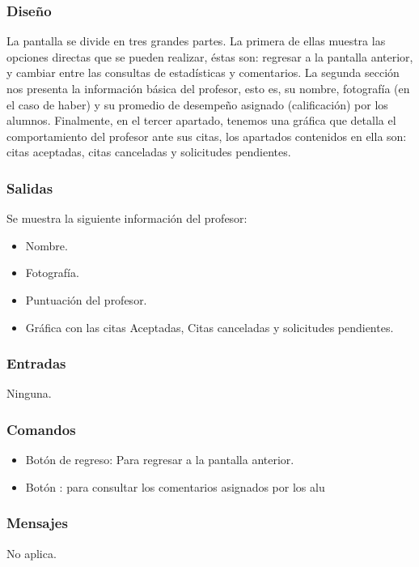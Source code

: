 \subsubsection{Diseño}
	\noindent
	La pantalla se divide en tres grandes partes. La primera de ellas muestra las opciones directas que se pueden realizar, éstas son: regresar a la pantalla anterior, y cambiar entre las consultas de estadísticas y comentarios. La segunda sección nos presenta la información básica del profesor, esto es, su nombre, fotografía (en el caso de haber) y su promedio de desempeño asignado (calificación) por los alumnos. Finalmente, en el tercer apartado, tenemos una gráfica que detalla el comportamiento del profesor ante sus citas, los apartados contenidos en ella son: citas aceptadas, citas canceladas y solicitudes pendientes. 

\pagebreak
{}

\subsubsection{Salidas}
	Se muestra la siguiente información del profesor:
	\begin{itemize} 
		\item Nombre.
		\item Fotografía.
		\item Puntuación del profesor.
		\item Gráfica con las citas Aceptadas, Citas canceladas y solicitudes pendientes.
	\end{itemize}

\subsubsection{Entradas}
	\noindent
	Ninguna.

\subsubsection{Comandos}
\begin{itemize}
	\item Botón de regreso: Para regresar a la pantalla anterior.
	\item Botón : para consultar los comentarios asignados por los alu
\end{itemize}

\subsubsection{Mensajes}
	\noindent
	No aplica.

